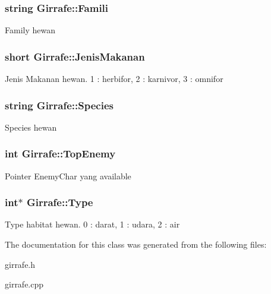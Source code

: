 \subsubsection[{\texorpdfstring{Famili}{Famili}}]{\setlength{\rightskip}{0pt plus 5cm}string Girrafe\+::\+Famili\hspace{0.3cm}{\ttfamily [protected]}}\hypertarget{class_girrafe_a9757821b54f0cbf0c3ca8e619e239c2e}{}\label{class_girrafe_a9757821b54f0cbf0c3ca8e619e239c2e}
Family hewan 
\subsubsection[{\texorpdfstring{Jenis\+Makanan}{JenisMakanan}}]{\setlength{\rightskip}{0pt plus 5cm}short Girrafe\+::\+Jenis\+Makanan\hspace{0.3cm}{\ttfamily [protected]}}\hypertarget{class_girrafe_a2a30099c71c69b40009b992bd9cf3416}{}\label{class_girrafe_a2a30099c71c69b40009b992bd9cf3416}
Jenis Makanan hewan. 1 \+: herbifor, 2 \+: karnivor, 3 \+: omnifor 
\subsubsection[{\texorpdfstring{Species}{Species}}]{\setlength{\rightskip}{0pt plus 5cm}string Girrafe\+::\+Species\hspace{0.3cm}{\ttfamily [protected]}}\hypertarget{class_girrafe_a5d6f7d0b8fe1da9d021ed3c902982e59}{}\label{class_girrafe_a5d6f7d0b8fe1da9d021ed3c902982e59}
Species hewan 
\subsubsection[{\texorpdfstring{Top\+Enemy}{TopEnemy}}]{\setlength{\rightskip}{0pt plus 5cm}int Girrafe\+::\+Top\+Enemy\hspace{0.3cm}{\ttfamily [protected]}}\hypertarget{class_girrafe_a67c24ce4eef051821025dc278995d28d}{}\label{class_girrafe_a67c24ce4eef051821025dc278995d28d}
Pointer Enemy\+Char yang available 
\subsubsection[{\texorpdfstring{Type}{Type}}]{\setlength{\rightskip}{0pt plus 5cm}int$\ast$ Girrafe\+::\+Type\hspace{0.3cm}{\ttfamily [protected]}}\hypertarget{class_girrafe_ac7952abbeb17d1d7bf219a2785521a30}{}\label{class_girrafe_ac7952abbeb17d1d7bf219a2785521a30}
Type habitat hewan. 0 \+: darat, 1 \+: udara, 2 \+: air 

The documentation for this class was generated from the following files\+:\begin{DoxyCompactItemize}
\item 
girrafe.\+h\item 
girrafe.\+cpp\end{DoxyCompactItemize}
